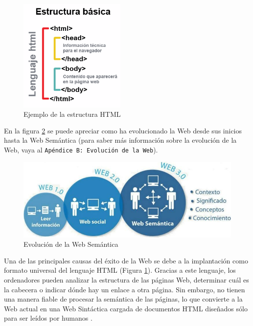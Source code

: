 \begin{figure}[H]
	\centering
	\includegraphics[height=5.6cm]{imagenes/capitulo3/estructurabasica} 
	\caption{Ejemplo de la estructura HTML \cite{imagen-html}}
	\label{html}
\end{figure}

En la figura \ref{fig:web} se puede apreciar como ha evolucionado la Web desde sus inicios hasta la Web Semántica (para saber más información sobre la evolución de la Web, vaya al \texttt{Apéndice B: Evolución de la Web}).

\begin{figure}[H]
	\centering
	\includegraphics[width=0.7\linewidth]{imagenes/capitulo3/WEB}
	\caption{Evolución de la Web Semántica}
	\label{fig:web}
\end{figure}


Una de las principales causas del éxito de la Web se debe a la implantación como formato universal del lenguaje HTML (Figura \ref{html}). Gracias a este lenguaje, los ordenadores pueden analizar la estructura de las páginas Web, determinar cuál es la cabecera o indicar dónde hay un enlace a otra página. Sin embargo, no tienen una manera fiable de procesar la semántica de las páginas, lo que convierte a la Web actual en una Web Sintáctica cargada de documentos HTML diseñados sólo para ser leídos por humanos \cite{apuntes-clase-jose}.\\

